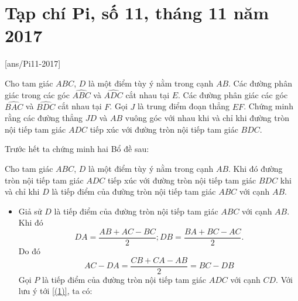 \section{Tạp chí Pi, số 11,  tháng 11 năm 2017}
[ans/Pi11-2017]

\begin{bt}%
	Cho tam giác $ABC$, $D$ là một điểm tùy ý nằm trong cạnh $AB$. Các đường phân giác trong các góc $\widehat{ABC}$ và $\widehat{ADC}$ cắt nhau tại $E$. Các đường phân giác các góc $\widehat{BAC}$ và $\widehat{BDC}$ cắt nhau tại $F$. Gọi $J$ là trung điểm đoạn thẳng $EF$. Chứng minh rằng các đường thẳng $JD$ và $AB$ vuông góc với nhau khi và chỉ khi đường tròn nội tiếp tam giác $ADC$ tiếp xúc với đường tròn nội tiếp tam giác $BDC$.
	\loigiai
	{Trước hết ta chứng minh hai Bổ đề sau:
		\begin{bode}[1]\label{bd1}
			Cho tam giác $ABC$, $D$ là một điểm tùy ý nằm trong cạnh $AB$. Khi đó đường tròn nội tiếp tam giác $ADC$ tiếp xúc với đường tròn nội tiếp tam giác $BDC$ khi và chỉ khi $D$ là tiếp điểm của đường tròn nội tiếp tam giác $ABC$ với cạnh $AB$.
		\end{bode}
		\begin{center}
		\end{center}
		\begin{itemize}
			\item Giả sử $D$ là tiếp điểm của đường tròn nội tiếp tam giác $ABC$ với cạnh $AB$. Khi đó
			$$DA=\dfrac{AB+AC-BC}{2}; DB=\dfrac{BA+BC-AC}{2}.$$
			Do đó
			\begin{equation}\label{(1)}
			AC-DA=\dfrac{CB+CA-AB}{2}=BC-DB
			\end{equation}
			Gọi $P$ là tiếp điểm của đường tròn nội tiếp tam giác $ADC$ với cạnh $CD$. Với lưu ý tới \ref{(1)}, ta có:

\end{itemize}}
\end{bt}
